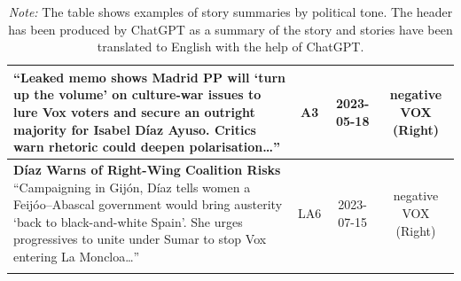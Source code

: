 \documentclass[12pt]{article}
\begin{document}
\begin{longtable}{|p{8cm}|c|c|c|}
{\scriptsize
	“Leaked memo shows Madrid PP will ‘turn up the volume’ on culture-war issues to lure Vox voters and secure an outright majority for Isabel Díaz Ayuso.  
	Critics warn rhetoric could deepen polarisation…”}
& A3 & 2023-05-18 & negative VOX (Right)\\
\hline
\textbf{Díaz Warns of Right-Wing Coalition Risks}\newline
{\scriptsize
	“Campaigning in Gijón, Díaz tells women a Feijóo–Abascal government would bring austerity ‘back to black-and-white Spain’.  
	She urges progressives to unite under Sumar to stop Vox entering La Moncloa…”}
& LA6 & 2023-07-15 & negative VOX (Right)\\
\hline
\caption*{\small \textit{Note:} The table shows examples of story summaries by political tone. The header has been produced by ChatGPT as a summary of the story and stories have been translated to English with the help of ChatGPT.}
\end{longtable}
\label{tab:examples_stories}
\end{document}

